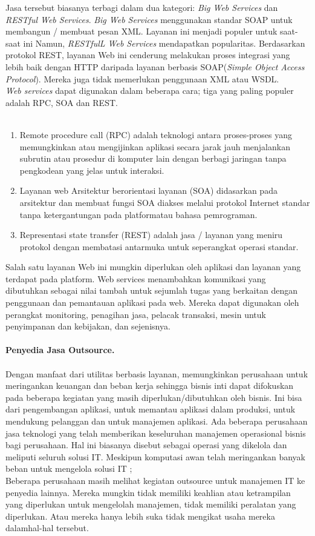 \tab Jasa tersebut biasanya terbagi dalam dua kategori: \textit{Big Web Services} dan \textit{RESTful Web Services}. \textit{Big Web Services} menggunakan standar SOAP untuk membangun / membuat pesan XML. Layanan ini menjadi populer untuk saat-saat ini Namun, \textit{RESTfulL Web Services} mendapatkan popularitas. Berdasarkan protokol  REST,  layanan Web ini cenderung    melakukan proses integrasi yang lebih baik dengan  HTTP  daripada  layanan  berbasis  SOAP(\textit{Simple Object Access Protocol}). Mereka juga tidak memerlukan penggunaan XML atau WSDL.\\
\tab \textit{Web services} dapat digunakan dalam beberapa cara; tiga yang paling populer adalah RPC, SOA dan REST.\\\\
\begin{enumerate}
\item Remote procedure call (RPC) adalah teknologi antara proses-proses yang memungkinkan atau mengijinkan aplikasi secara jarak jauh menjalankan subrutin atau prosedur di komputer lain dengan berbagi jaringan tanpa pengkodean yang jelas untuk interaksi.
\item Layanan web Arsitektur berorientasi layanan (SOA) didasarkan  pada  arsitektur dan membuat fungsi SOA diakses melalui protokol Internet standar tanpa ketergantungan pada platformatau bahasa pemrograman.
\item Representasi state transfer (REST) adalah jasa / layanan yang meniru protokol dengan membatasi antarmuka untuk seperangkat operasi  standar.
\end{enumerate}
Salah satu layanan Web ini mungkin diperlukan oleh aplikasi dan layanan yang terdapat pada platform. Web services menambahkan komunikasi yang dibutuhkan sebagai nilai tambah untuk sejumlah tugas yang berkaitan dengan penggunaan dan pemantauan aplikasi pada web.  Mereka dapat digunakan oleh perangkat monitoring, penagihan jasa, pelacak transaksi, mesin untuk penyimpanan dan kebijakan,  dan sejenisnya.\\\\
\textbf{Penyedia Jasa Outsource.}\\\\
Dengan manfaat dari utilitas berbasis layanan, memungkinkan perusahaan untuk meringankan keuangan dan beban kerja sehingga bisnis inti dapat difokuskan pada beberapa kegiatan yang masih diperlukan/dibutuhkan oleh bisnis. Ini bisa dari pengembangan aplikasi, untuk memantau aplikasi dalam produksi, untuk mendukung pelanggan dan untuk manajemen aplikasi. Ada beberapa perusahaan jasa teknologi yang telah memberikan keseluruhan manajemen operasional bisnis bagi perusahaan. Hal ini biasanya disebut sebagai operasi yang dikelola dan meliputi seluruh solusi IT. Meskipun komputasi awan telah meringankan banyak beban untuk mengelola solusi IT ;\\
Beberapa perusahaan masih melihat kegiatan outsource untuk manajemen IT ke penyedia lainnya. Mereka mungkin tidak memiliki keahlian atau ketrampilan yang diperlukan untuk mengelolah manajemen, tidak memiliki peralatan yang diperlukan. Atau mereka  hanya  lebih suka tidak mengikat usaha mereka dalamhal-hal tersebut.\\
